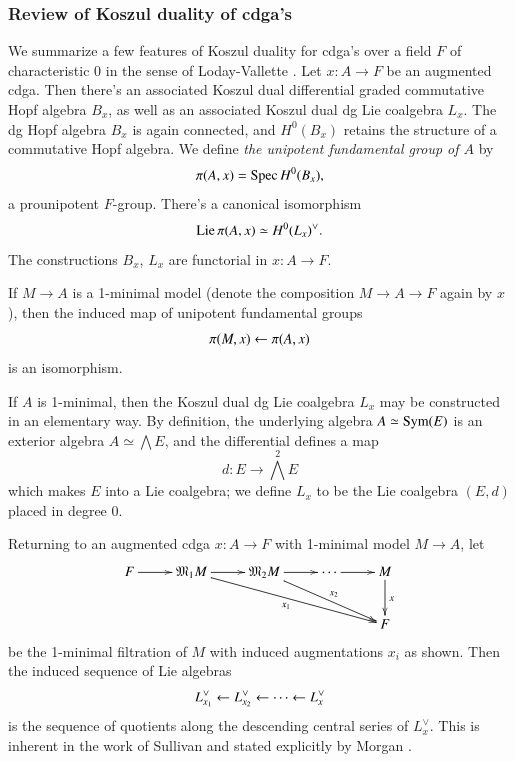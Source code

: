 \subsubsection{Review of Koszul duality of cdga's}
\label{PP33}
We summarize a few features of Koszul duality for cdga's over a field $F$ of characteristic 0 in the sense of Loday-Vallette \cite{LodayVallette}. Let $x:A \to F$ be an augmented cdga. Then there's an associated Koszul dual differential graded commutative Hopf algebra $B_x$, as well as an associated Koszul dual dg Lie coalgebra $L_x$. The dg Hopf algebra $B_x$ is again connected, and $H^0(B_x)$ retains the structure of a commutative Hopf algebra. We define \emph{the unipotent fundamental group of $A$} by 
\[
\pi(A,x) = \operatorname{Spec} H^0(B_x),
\]
a prounipotent $F$-group. There's a canonical isomorphism
\[
\operatorname{Lie} \pi(A,x) \simeq H^0(L_x)^\lor. 
\]
The constructions $B_x$, $L_x$ are functorial in $x:A \to F$.

If $M \to A$ is a 1-minimal model (denote the composition $M \to A \to F$ again by $x$), then the induced map of unipotent fundamental groups
\[
\pi(M,x) \leftarrow \pi(A,x)
\]
is an isomorphism.

If $A$ is 1-minimal, then the Koszul dual dg Lie coalgebra $L_x$ may be constructed in an elementary way. By definition, the underlying algebra $A \simeq \operatorname{Sym}(E)$ is an exterior algebra $A \simeq \bigwedge E$, and the differential defines a map
\[
d: E \to \bigwedge^2 E
\]
which makes $E$ into a Lie coalgebra; we define $L_x$ to be the Lie coalgebra $(E,d)$ placed in degree $0$. 

Returning to an augmented cdga $x:A \to F$ with 1-minimal model $M \to A$, let 
\[
\xymatrix{
F \ar[r] & \fkM_1 M \ar[drrr]_{x_1} \ar[r]  & \fkM_2 M  \ar[drr]^-{x_2} \ar[r]  & \cdots \ar[r] & M \ar[d]^{x}
\\
&&&& F
}
\]
be the 1-minimal filtration of $M$ with induced augmentations $x_i$ as shown. Then the induced sequence of Lie algebras 
\[
L_{x_1}^\lor \leftarrow L_{x_2}^\lor \leftarrow \cdots \leftarrow L_x^\lor
\]
is the sequence of quotients along the descending central series of $L_x^\lor$. This is inherent in the work of Sullivan \cite{Sullivan} and stated explicitly by Morgan \cite[paragraph 5.11]{Morgan}.

